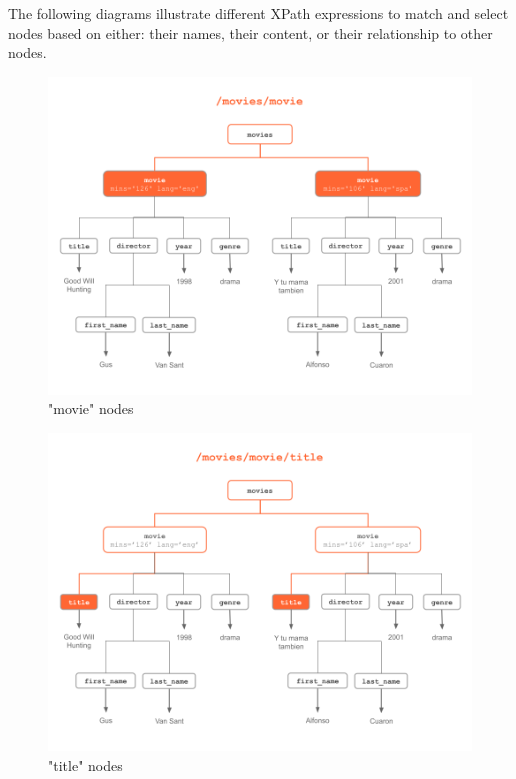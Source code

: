 \documentclass[
]{book}
\begin{document}
The following diagrams illustrate different XPath expressions to match and
select nodes based on either: their names, their content, or their relationship
to other nodes.

\begin{figure}

{\centering \includegraphics[width=0.85\linewidth]{images/xpath/xpath-example1} 

}

\caption{"movie" nodes}\label{fig:unnamed-chunk-51}
\end{figure}

\begin{figure}

{\centering \includegraphics[width=0.85\linewidth]{images/xpath/xpath-example2} 

}

\caption{"title" nodes}\label{fig:unnamed-chunk-52}
\end{figure}
\end{document}
